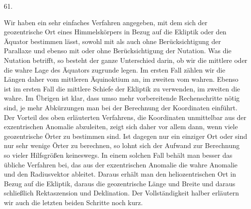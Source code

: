\par{}\medskip
\hypertarget{native-080-article061}{}
\begin{center}61.\end{center}
Wir haben ein sehr einfaches Verfahren angegeben, mit dem sich der geozentrische Ort eines Himmelskörpers in Bezug auf die Ekliptik oder den Äquator bestimmen lässt, sowohl mit als auch ohne Berücksichtigung der Parallaxe und ebenso mit oder ohne Berücksichtigung der Nutation. Was die Nutation betrifft, so besteht der ganze Unterschied darin, ob wir die mittlere oder die wahre Lage des Äquators zugrunde legen. Im ersten Fall zählen wir die Längen daher vom mittleren Äquinoktium an, im zweiten vom wahren. Ebenso ist im ersten Fall die mittlere Schiefe der Ekliptik zu verwenden, im zweiten die wahre. Im Übrigen ist klar, dass umso mehr vorbereitende Rechenschritte nötig sind, je mehr Abkürzungen man bei der Berechnung der Koordinaten einführt. Der Vorteil des oben erläuterten Verfahrens, die Koordinaten unmittelbar aus der exzentrischen Anomalie abzuleiten, zeigt sich daher vor allem dann, wenn viele geozentrische Örter zu bestimmen sind. Ist dagegen nur ein einziger Ort oder sind nur sehr wenige Örter zu berechnen, so lohnt sich der Aufwand zur Berechnung so vieler Hilfsgrößen keineswegs. In einem solchen Fall behält man besser das übliche Verfahren bei, das aus der exzentrischen Anomalie die wahre Anomalie und den Radiusvektor ableitet. Daraus erhält man den heliozentrischen Ort in Bezug auf die Ekliptik, daraus die geozentrische Länge und Breite und daraus schließlich Rektaszension und Deklination. Der Vollständigkeit halber erläutern wir auch die letzten beiden Schritte noch kurz.
